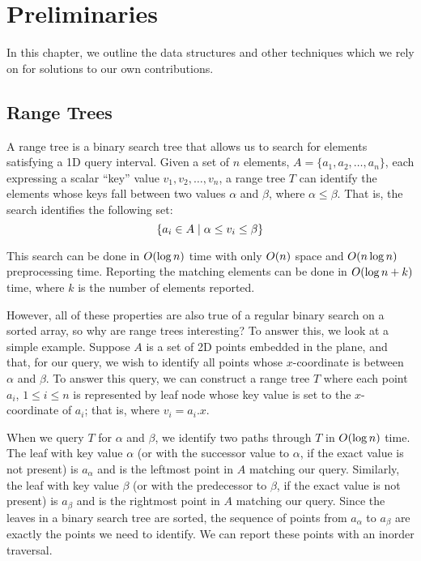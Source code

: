 \chapter{Preliminaries}
\label{:prelim}

In this chapter, we outline the data structures and other techniques which we rely on for solutions to our own contributions.

\section{Range Trees}
\label{:prelim:range-trees}

A range tree is a binary search tree that allows us to search for elements satisfying a 1D query interval.
Given a set of $n$ elements, $A = \{a_1, a_2, \ldots, a_n\}$, each expressing a scalar ``key'' value $v_1, v_2, \ldots, v_n$, a range tree $T$ can identify the elements whose keys fall between two values $\alpha$ and $\beta$, where $\alpha \leq \beta$.
That is, the search identifies the following set:
\[
\{ a_i \in A \;|\; \alpha \leq v_i \leq \beta \}
\]

This search can be done in $O\!\left(\log{n}\right)$ time with only $O\!\left(n\right)$ space and $O\!\left(n\log{n}\right)$ preprocessing time.
Reporting the matching elements can be done in $O\!\left(\log{n} + k\right)$ time, where $k$ is the number of elements reported. 

However, all of these properties are also true of a regular binary search on a sorted array, so why are range trees interesting? 
To answer this, we look at a simple example.
Suppose $A$ is a set of 2D points embedded in the plane, and that, for our query, we wish to identify all points whose $x$-coordinate is between $\alpha$ and $\beta$.
To answer this query, we can construct a range tree $T$ where each point $a_i$, $1 \leq i \leq n$ is represented by leaf node whose key value is set to the $x$-coordinate of $a_i$; that is, where $v_i = a_i.x$.

When we query $T$ for $\alpha$ and $\beta$, we identify two paths through $T$ in $O\!\left(\log{n}\right)$ time. The leaf with key value $\alpha$ (or with the successor value to $\alpha$, if the exact value is not present) is $a_\alpha$ and is the leftmost point in $A$ matching our query.  Similarly, the leaf with key value $\beta$ (or with the  predecessor to $\beta$, if the exact value is not present) is $a_\beta$ and is the rightmost point in $A$ matching our query. Since the leaves in a binary search tree are sorted, the sequence of points from $a_\alpha$ to $a_\beta$ are exactly the points we need to identify. We can report these points with an inorder traversal.

